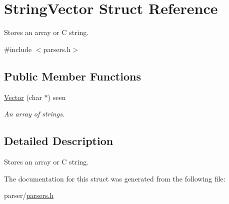 \hypertarget{struct_string_vector}{}\section{String\+Vector Struct Reference}
\label{struct_string_vector}


Stores an array or C string.  




{\ttfamily \#include $<$parsers.\+h$>$}

\subsection*{Public Member Functions}
\begin{DoxyCompactItemize}
\item 
\hyperlink{struct_string_vector_a2e46e6de7ef6fc2f1138335a12087986}{Vector} (char $\ast$) seen\hypertarget{struct_string_vector_a2e46e6de7ef6fc2f1138335a12087986}{}\label{struct_string_vector_a2e46e6de7ef6fc2f1138335a12087986}

\begin{DoxyCompactList}\small\item\em An array of strings. \end{DoxyCompactList}\end{DoxyCompactItemize}


\subsection{Detailed Description}
Stores an array or C string. 

The documentation for this struct was generated from the following file\+:\begin{DoxyCompactItemize}
\item 
parser/\hyperlink{parsers_8h}{parsers.\+h}\end{DoxyCompactItemize}
